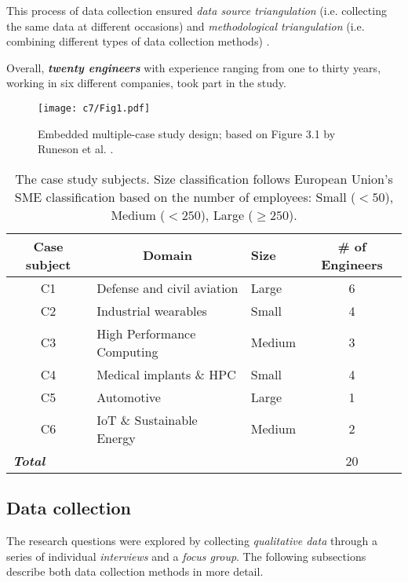 This process of data collection ensured \textit{data source triangulation} (i.e. collecting the same data at different occasions) and \textit{methodological triangulation} (i.e. combining different types of data collection methods) \cite{Runeson2012}.

Overall, \textit{\textbf{twenty engineers}} with experience ranging from one to thirty years, working in six different companies, took part in the study.

\begin{figure}
    \centering
    \texttt{[image: c7/Fig1.pdf]}
    \caption{Embedded multiple-case study design; based on Figure 3.1 by Runeson et al. \cite{Runeson2012}.}
    \label{c7:fig:case-study-design}
\end{figure}

\begin{table}[tbp]
    \centering
    \footnotesize
    \caption{The case study subjects. Size classification follows European Union's SME classification based on the number of employees: Small ($< 50$), Medium ($< 250$), Large ($\ge 250$).}
    \label{c7:tab:case-study-subjects}
    \begin{tabular}{@{}cllc@{}}
    \toprule
    \multicolumn{1}{c}{\textbf{Case subject}} & \multicolumn{1}{c}{\textbf{Domain}} & \textbf{Size} & \textbf{\# of Engineers} \\ \midrule
    C1 & Defense and civil aviation & Large & 6 \\
    C2 & Industrial wearables & Small & 4 \\
    C3 & High Performance Computing & Medium & 3 \\
    C4 & Medical implants \& HPC & Small & 4 \\
    C5 & Automotive & Large & 1 \\
    C6 & IoT \& Sustainable Energy & Medium & 2 \\\midrule
    \multicolumn{3}{l}{\textit{\textbf{Total}}} & 20 \\\bottomrule
    \end{tabular}
\end{table}

\subsection{Data collection}
The research questions were explored by collecting \textit{qualitative data} through a series of individual \textit{interviews} and a \textit{focus group}. 
The following subsections describe both data collection methods in more detail.

